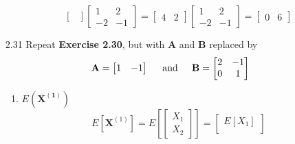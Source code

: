 \begin{enumerate}[font=\bfseries]
\begin{enumerate}
\[\begin{bmatrix}
                \end{bmatrix}
                \begin{bmatrix}
                    1 & 2 \\
                    -2 & -1
                \end{bmatrix}
                =
                \begin{bmatrix}
                    4 & 2
                \end{bmatrix}
                \begin{bmatrix}
                    1 & 2 \\
                    -2 & -1
                \end{bmatrix}
                =
                \begin{bmatrix}
                    0 & 6
                \end{bmatrix}
            \]
        \end{enumerate}
        \item[2.31] Repeat \textbf{Exercise 2.30}, but with $\mathbf{A}$ and $\mathbf{B}$ replaced by
        \[
            \mathbf{A}
            =
            \begin{bmatrix}
                1 & -1
            \end{bmatrix}
            \hspace{0.2in}\text{and}\hspace{0.2in}
            \mathbf{B}
            =
            \begin{bmatrix}
                2 & -1 \\
                0 & 1
            \end{bmatrix}
        \]
        \begin{enumerate}
            \item $E\left(\mathbf{X^{(1)}}\right)$
            \[
                E\left[\mathbf{X}^{(1)}\right]
                = 
                E\left[
                    \begin{bmatrix}
                        X_1 \\
                        X_2
                    \end{bmatrix}
                \right]
                =
                \begin{bmatrix}
                    E[X_1] \\

\end{bmatrix}\]
\end{enumerate}
\end{enumerate}
